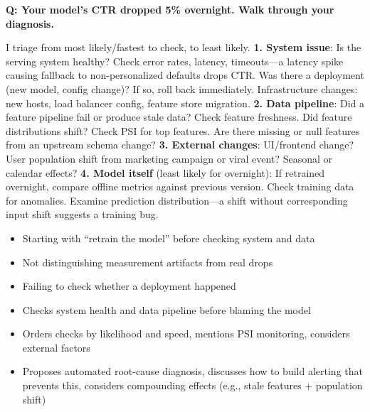 \begin{interviewq}
\textbf{Q: Your model's CTR dropped 5\% overnight. Walk through your diagnosis.}

 \quad {} \quad \badgefreq{\freqhigh}

\stronganswer I triage from most likely/fastest to check, to least likely. \textbf{1. System issue}: Is the serving system healthy? Check error rates, latency, timeouts---a latency spike causing fallback to non-personalized defaults drops CTR. Was there a deployment (new model, config change)? If so, roll back immediately. Infrastructure changes: new hosts, load balancer config, feature store migration. \textbf{2. Data pipeline}: Did a feature pipeline fail or produce stale data? Check feature freshness. Did feature distributions shift? Check PSI for top features. Are there missing or null features from an upstream schema change? \textbf{3. External changes}: UI/frontend change? User population shift from marketing campaign or viral event? Seasonal or calendar effects? \textbf{4. Model itself} (least likely for overnight): If retrained overnight, compare offline metrics against previous version. Check training data for anomalies. Examine prediction distribution---a shift without corresponding input shift suggests a training bug.

\redflags
\begin{itemize}
    \item Starting with ``retrain the model'' before checking system and data
    \item Not distinguishing measurement artifacts from real drops
    \item Failing to check whether a deployment happened
\end{itemize}


\goodgreat
\begin{itemize}
    \item {} Checks system health and data pipeline before blaming the model
    \item {} Orders checks by likelihood and speed, mentions PSI monitoring, considers external factors
    \item {} Proposes automated root-cause diagnosis, discusses how to build alerting that prevents this, considers compounding effects (e.g., stale features + population shift)
\end{itemize}

\end{interviewq}

